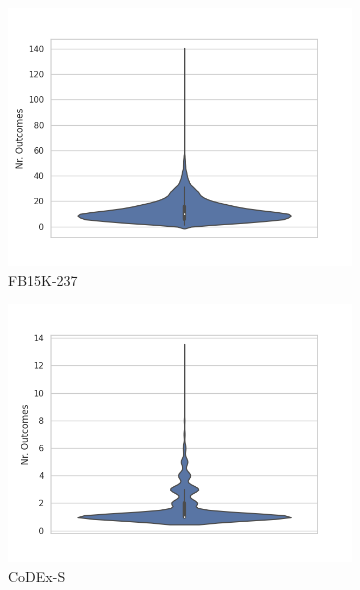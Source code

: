 \begin{figure}
    \centering
    \begin{subfigure}[b]{0.32\textwidth}
        \includegraphics[trim=0cm 11mm 1cm 0pt, clip]{figures/datasets/fb15k-237.png}
        \caption{FB15K-237}
    \end{subfigure}
    \begin{subfigure}[b]{0.32\textwidth}
        \includegraphics[trim=0cm 11mm 1cm 0pt, clip]{figures/datasets/codex-s.png}
        \caption{CoDEx-S}
    \end{subfigure}
    \begin{subfigure}[b]{0.32\textwidth}

\end{subfigure}
\end{figure}
